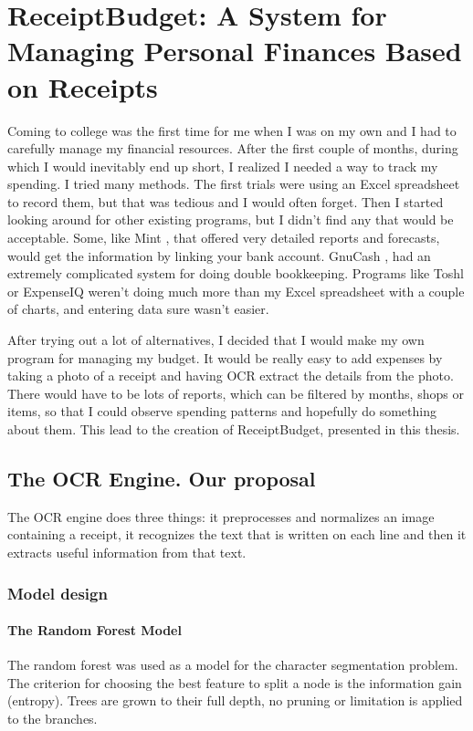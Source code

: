 \chapter{ReceiptBudget: A System for Managing Personal Finances Based on Receipts}
\label{chap:application}

Coming to college was the first time for me when I was on my own and I had to carefully manage my financial resources. After the first couple of months, during which I would inevitably end up short, I realized I needed a way to track my spending. I tried many methods. The first trials were using an Excel spreadsheet to record them, but that was tedious and I would often forget. Then I started looking around for other existing programs, but I didn't find any that would be acceptable. Some, like Mint \cite{mint}, that offered very detailed reports and forecasts, would get the information by linking your bank account. GnuCash \cite{gnucash}, had an extremely complicated system for doing double bookkeeping. Programs like Toshl \cite{toshl} or ExpenseIQ \cite{expenseiq} weren't doing much more than my Excel spreadsheet with a couple of charts, and entering data sure wasn't easier. 

After trying out a lot of alternatives, I decided that I would make my own program for managing my budget. It would be really easy to add expenses by taking a photo of a receipt and having OCR extract the details from the photo. There would have to be lots of reports, which can be filtered by months, shops or items, so that I could observe spending patterns and hopefully do something about them. This lead to the creation of ReceiptBudget, presented in this thesis. 

\section{The OCR Engine. Our proposal}
The OCR engine does three things: it preprocesses and normalizes an image containing a receipt, it recognizes the text that is written on each line and then it extracts useful information from that text. 

\subsection{Model design}

\subsubsection{The Random Forest Model}
The random forest was used as a model for the character segmentation problem. The criterion for choosing the best feature to split a node is the information gain (entropy). Trees are grown to their full depth, no pruning or limitation is applied to the branches. 


